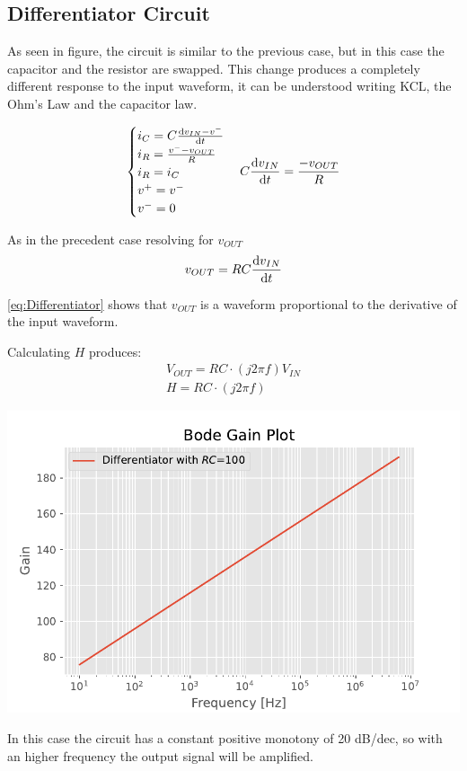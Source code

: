 \documentclass[a4paper,twocolumn]{article}
\begin{document}
\subsection{Differentiator Circuit}

As seen in figure, the circuit is similar to the previous case, but in this case the capacitor and the resistor are swapped. This change produces a completely different response to the input waveform, it can be understood writing KCL, the Ohm's Law and the capacitor law.

\begin{gather*}
    \begin{cases}
        i_C = C\dv{v_{IN}-v^-}{t}\\
        i_R = \frac{v^--v_{OUT}}{R}\\
        i_R = i_C\\
        v^+=v^-\\
        v^-=0
    \end{cases}
    C\dv{v_{IN}}{t}=\frac{-v_{OUT}}{R}
\end{gather*}

As in the precedent case resolving for $v_{OUT}$
\begin{equation}
\label{eq:Differentiator}
    v_{OUT}=RC\dv{v_{IN}}{t}
\end{equation}

\eqref{eq:Differentiator} shows that $v_{OUT}$ is a waveform proportional to the derivative of the input waveform. 

Calculating \(H\) produces:
\begin{gather}
    V_{OUT}=RC\cdot(j2\pi f)V_{IN}\\
    H = RC\cdot(j2\pi f)
\end{gather}

\begin{center}
    \includegraphics[width=\columnwidth]{graph/DifferentiatorBodeTheo}
    \label{fig:DiffBodeGraphTheo}
\end{center}
In this case the circuit has a constant positive monotony of 20 dB/dec, so with an higher frequency the output signal will be amplified.
\end{document}
